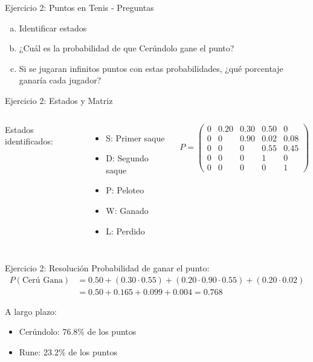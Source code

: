 \documentclass{beamer}
\begin{document}
\begin{frame}{Ejercicio 2: Puntos en Tenis - Preguntas}
    \begin{enumerate}[a)]
        \item Identificar estados
        \item ¿Cuál es la probabilidad de que Cerúndolo gane el punto?
        \item Si se jugaran infinitos puntos con estas probabilidades, ¿qué porcentaje ganaría cada jugador?
    \end{enumerate}
\end{frame}

\begin{frame}{Ejercicio 2: Estados y Matriz}
    \begin{columns}
        Estados identificados:
        \begin{itemize}
            \item S: Primer saque
            \item D: Segundo saque
            \item P: Peloteo
            \item W: Ganado
            \item L: Perdido
        \end{itemize}
        
        \[P = \begin{pmatrix}
        0 & 0.20 & 0.30 & 0.50 & 0 \\
        0 & 0 & 0.90 & 0.02 & 0.08 \\
        0 & 0 & 0 & 0.55 & 0.45 \\
        0 & 0 & 0 & 1 & 0 \\
        0 & 0 & 0 & 0 & 1
        \end{pmatrix}\]
    \end{columns}
\end{frame}

\begin{frame}{Ejercicio 2: Resolución}
    Probabilidad de ganar el punto:
    \[
    \begin{split}
    P(\text{Cerú Gana}) &= 0.50 + (0.30 \cdot 0.55) + (0.20 \cdot 0.90 \cdot 0.55) + (0.20 \cdot 0.02) \\
    &= 0.50 + 0.165 + 0.099 + 0.004 = 0.768
    \end{split}
    \]
    
    A largo plazo:
    \begin{itemize}
        \item Cerúndolo: 76.8\% de los puntos
        \item Rune: 23.2\% de los puntos
    \end{itemize}
\end{frame}
\end{document}
